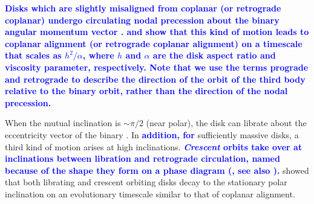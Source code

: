 \documentclass[twocolumn,linenumbers]{aastex631}
\newcommand{\RGM}[1]{\textcolor{cyan}{#1}}
\newcommand{\RR}[1]{\textcolor{blue}{\bf#1}} %
\newcommand{\RP}[1]{\RR{#1}} %
\begin{document}
\RR{Disks which are slightly misaligned from coplanar (or retrograde coplanar)  undergo circulating nodal precession about the binary angular momentum vector \citep{papaloizou1995}. \citet{bate2000} and \citet{lubow2000} show that this kind of motion leads to coplanar alignment {(or retrograde coplanar alignment)} on a timescale that scales as $h^2/\alpha$, where $h$ and $\alpha$ are the disk aspect ratio and viscosity parameter, respectively. Note that we use the terms prograde and retrograde to describe the direction of the orbit of the third body relative to the binary orbit, rather than the direction of the nodal precession. }

When the mutual inclination is $\sim\pi/2$ (near polar), the disk can librate about the eccentricity vector of the binary \citep[e.g.,][]{verrier2009,farago2010,doolin2011}. In \RR{addition, for} sufficiently massive disks, a third kind of motion arises at high inclinations. 
\RR{{\it Crescent} orbits take over at inclinations between libration and retrograde circulation, named because of the shape they form on a phase diagram  (\citealt{chen2019}, see also \citealt{zanazzi2018}). }
\citet{abod2022} showed that both librating and crescent orbiting disks decay to the stationary polar inclination \citep[see][]{martin2019} on an evolutionary timescale similar to that of coplanar alignment.
\end{document}
